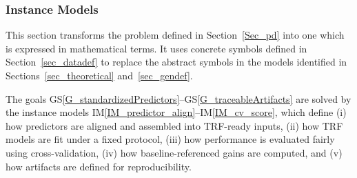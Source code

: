 \documentclass[12pt]{article}
\newcommand{\colAwidth}{0.13\textwidth}
\newcommand{\colBwidth}{0.82\textwidth}
\begin{document}



\subsubsection{Instance Models} \label{sec_instance}    


This section transforms the problem defined in Section~\ref{Sec_pd} into 
one which is expressed in mathematical terms. It uses concrete symbols defined 
in Section~\ref{sec_datadef} to replace the abstract symbols in the models 
identified in Sections~\ref{sec_theoretical} and~\ref{sec_gendef}.


The goals GS\ref{G_standardizedPredictors}--GS\ref{G_traceableArtifacts} are solved by the
instance models IM\ref{IM_predictor_align}--IM\ref{IM_cv_score}, which define
(i) how predictors are aligned and assembled into TRF-ready inputs, (ii) how TRF
models are fit under a fixed protocol, (iii) how performance is evaluated fairly
using cross-validation, (iv) how baseline-referenced gains are computed, and (v)
how artifacts are defined for reproducibility.
\end{document}
